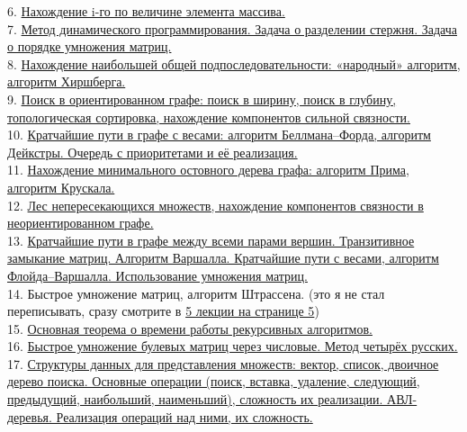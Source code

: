 \documentclass[a4paper]{article}
\theoremstyle{indented}
\theoremstyle{definition}
\theoremstyle{remark}
\begin{document}
6. \hyperlink{t4}{Нахождение i-го по величине элемента массива.} \\ 

7. \hyperlink{e1}{Метод динамического программирования. Задача о разделении стержня. Задача о порядке умножения матриц.} \\ 

8. \hyperlink{d2}{Нахождение наибольшей общей подпоследовательности: «народный» алгоритм, алгоритм Хиршберга.} \\ 

9. \hyperlink{t10}{Поиск в ориентированном графе: поиск в ширину, поиск в глубину, топологическая сортировка, нахождение компонентов сильной связности.} \\ 

10. \hyperlink{t14}{Кратчайшие пути в графе с весами: алгоритм Беллмана–Форда, алгоритм Дейкстры. Очередь с приоритетами и её реализация.} \\ 

11. \hyperlink{t17}{Нахождение минимального остовного дерева графа: алгоритм Прима, алгоритм Крускала.} \\

12. \hyperlink{t20}{Лес непересекающихся множеств, нахождение компонентов связности в неориентированном графе.} \\ 

13. \hyperlink{t22}{Кратчайшие пути в графе между всеми парами вершин. Транзитивное замыкание матриц. Алгоритм Варшалла. Кратчайшие пути с весами, алгоритм Флойда–Варшалла. Использование умножения матриц.}  \\ 

14. Быстрое умножение матриц, алгоритм Штрассена. (это я не стал переписывать, сразу смотрите в \href{https://users.math-cs.spbu.ru/~okhotin/teaching/algorithms_2020/okhotin_algorithms_2020_l5.pdf}{5 лекции на странице 5})\\ 

15. \hyperlink{t25}{Основная теорема о времени работы рекурсивных алгоритмов.} \\ 

16. \hyperlink{e2}{Быстрое умножение булевых матриц через числовые. Метод четырёх русских.} \\ 

17. \hyperlink{d13}{Структуры данных для представления множеств: вектор, список, двоичное дерево поиска. Основные операции (поиск, вставка, удаление, следующий, предыдущий, наибольший, наименьший), сложность их реализации. АВЛ-деревья. Реализация операций над ними, их сложность.} \\ 
\end{document}
